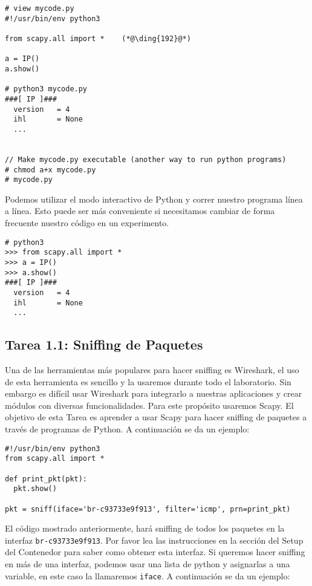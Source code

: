 \begin{lstlisting}
# view mycode.py
#!/usr/bin/env python3

from scapy.all import *    (*@\ding{192}@*)

a = IP()
a.show()

# python3 mycode.py
###[ IP ]###
  version   = 4
  ihl       = None
  ...


// Make mycode.py executable (another way to run python programs)
# chmod a+x mycode.py
# mycode.py 
\end{lstlisting}

Podemos utilizar el modo interactivo de Python y correr nuestro programa línea a línea. Esto puede ser más conveniente si necesitamos cambiar de forma frecuente nuestro código en un experimento.


\begin{lstlisting}
# python3
>>> from scapy.all import *
>>> a = IP()
>>> a.show()
###[ IP ]###
  version   = 4
  ihl       = None
  ...
\end{lstlisting}
 

\subsection{Tarea 1.1: Sniffing de Paquetes}  

Una de las herramientas más populares para hacer sniffing es Wireshark, el uso de esta herramienta es sencillo y la usaremos durante todo el laboratorio. Sin embargo es difícil usar Wireshark para integrarlo a nuestras aplicaciones y crear módulos con diversas funcionalidades. Para este propósito usaremos Scapy. El objetivo de esta Tarea es aprender a usar Scapy para hacer sniffing de paquetes a través de programas de Python.
A continuación se da un ejemplo:


\begin{lstlisting}
#!/usr/bin/env python3
from scapy.all import *

def print_pkt(pkt):
  pkt.show()

pkt = sniff(iface='br-c93733e9f913', filter='icmp', prn=print_pkt)
\end{lstlisting}

El código mostrado anteriormente, hará sniffing de todos los paquetes en la interfaz \texttt{br-c93733e9f913}. Por favor lea las instrucciones en la sección del Setup del Contenedor para saber como obtener esta interfaz.
Si queremos hacer sniffing en más de una interfaz, podemos usar una lista de python y asignarlas a una variable, en este caso la llamaremos \texttt{iface}.
A continuación se da un ejemplo:

